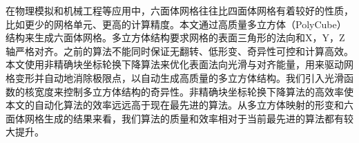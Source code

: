 \begin{cnabstract}
在物理模拟和机械工程等应用中，六面体网格往往比四面体网格有着较好的性质，比如更少的网格单元、更高的计算精度。本文通过高质量多立方体（PolyCube）结构来生成六面体网格。多立方体结构要求网格的表面三角形的法向和X，Y，Z轴严格对齐。之前的算法不能同时保证无翻转、低形变、奇异性可控和计算高效。本文使用非精确块坐标轮换下降算法来优化表面法向光滑与对齐能量，用来驱动网格变形并自动地消除极限点，以自动生成高质量的多立方体结构。我们引入光滑函数的核宽度来控制多立方体结构的奇异性。非精确块坐标轮换下降算法的高效率使本文的自动化算法的效率远远高于现在最先进的算法。从多立方体映射的形变和六面体网格生成的结果来看，我们算法的质量和效率相对于当前最先进的算法都有较大提升。


\end{cnabstract}

